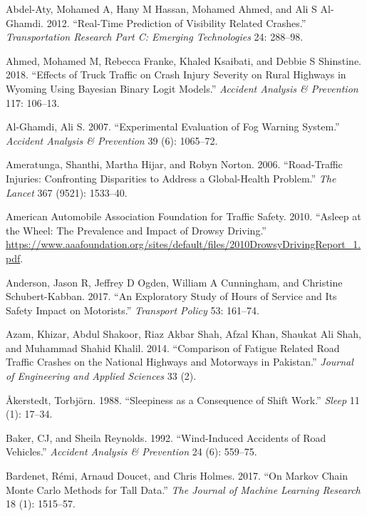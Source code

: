 \documentclass[12pt]{book}
\numberwithin{equation}{chapter}
\begin{document}
\hypertarget{refs}{}
\leavevmode\hypertarget{ref-abdel2012real}{}%
Abdel-Aty, Mohamed A, Hany M Hassan, Mohamed Ahmed, and Ali S Al-Ghamdi. 2012. ``Real-Time Prediction of Visibility Related Crashes.'' \emph{Transportation Research Part C: Emerging Technologies} 24: 288--98.

\leavevmode\hypertarget{ref-ahmed2018effects}{}%
Ahmed, Mohamed M, Rebecca Franke, Khaled Ksaibati, and Debbie S Shinstine. 2018. ``Effects of Truck Traffic on Crash Injury Severity on Rural Highways in Wyoming Using Bayesian Binary Logit Models.'' \emph{Accident Analysis \& Prevention} 117: 106--13.

\leavevmode\hypertarget{ref-al2007experimental}{}%
Al-Ghamdi, Ali S. 2007. ``Experimental Evaluation of Fog Warning System.'' \emph{Accident Analysis \& Prevention} 39 (6): 1065--72.

\leavevmode\hypertarget{ref-ameratunga2006road}{}%
Ameratunga, Shanthi, Martha Hijar, and Robyn Norton. 2006. ``Road-Traffic Injuries: Confronting Disparities to Address a Global-Health Problem.'' \emph{The Lancet} 367 (9521): 1533--40.

\leavevmode\hypertarget{ref-aaafoundation}{}%
American Automobile Association Foundation for Traffic Safety. 2010. ``Asleep at the Wheel: The Prevalence and Impact of Drowsy Driving.'' \url{https://www.aaafoundation.org/sites/default/files/2010DrowsyDrivingReport_1.pdf}.

\leavevmode\hypertarget{ref-anderson2017exploratory}{}%
Anderson, Jason R, Jeffrey D Ogden, William A Cunningham, and Christine Schubert-Kabban. 2017. ``An Exploratory Study of Hours of Service and Its Safety Impact on Motorists.'' \emph{Transport Policy} 53: 161--74.

\leavevmode\hypertarget{ref-azam2014comparison}{}%
Azam, Khizar, Abdul Shakoor, Riaz Akbar Shah, Afzal Khan, Shaukat Ali Shah, and Muhammad Shahid Khalil. 2014. ``Comparison of Fatigue Related Road Traffic Crashes on the National Highways and Motorways in Pakistan.'' \emph{Journal of Engineering and Applied Sciences} 33 (2).

\leavevmode\hypertarget{ref-aakerstedt1988sleepiness}{}%
Åkerstedt, Torbjörn. 1988. ``Sleepiness as a Consequence of Shift Work.'' \emph{Sleep} 11 (1): 17--34.

\leavevmode\hypertarget{ref-baker1992wind}{}%
Baker, CJ, and Sheila Reynolds. 1992. ``Wind-Induced Accidents of Road Vehicles.'' \emph{Accident Analysis \& Prevention} 24 (6): 559--75.

\leavevmode\hypertarget{ref-bardenet2017markov}{}%
Bardenet, Rémi, Arnaud Doucet, and Chris Holmes. 2017. ``On Markov Chain Monte Carlo Methods for Tall Data.'' \emph{The Journal of Machine Learning Research} 18 (1): 1515--57.
\end{document}
